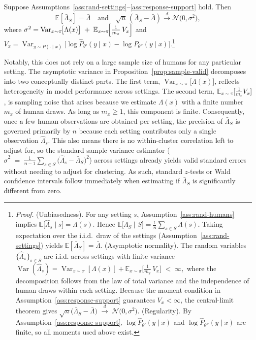 \begin{proposition}
\label{prop:sample-valid}
Suppose Assumptions~\ref{ass:rand-settings}--\ref{ass:response-support} hold.
Then
\[
\mathbb{E}[\bar{\Lambda}_{S}] = \bar{\Lambda}
\quad \text{and} \quad
\sqrt{n}\,(\bar{\Lambda}_{S}-\bar{\Lambda})
\xrightarrow{d} \mathcal{N}\bigl(0,\sigma^{2}\bigr),
\]
where $
\sigma^{2}
= \operatorname{Var}_{x\sim\pi}\!\bigl[\Lambda(x)\bigr]
\;+\;
\mathbb{E}_{x\sim\pi}\!\Bigl[\tfrac{1}{m_x}\,V_x\Bigr]$ and 
$V_x
= \operatorname{Var}_{y \sim P(\cdot \mid x)}
\bigl[\log\hat P_{\theta'}(y \mid x)
-\log\hat P_{\theta''}( y\mid x)\bigr].$\footnote{\emph{Proof.} (Unbiasedness).
For any setting $s$, Assumption~\ref{ass:rand-humans} implies $\mathbb{E}\bigl[\hat\Lambda_s \mid s\bigr]=\Lambda(s).$
Hence $\mathbb{E}\bigl[\bar\Lambda_S \mid S\bigr] = \frac{1}{n}\sum_{s \in S}\Lambda(s).$
Taking expectation over the i.i.d.\ draw of the settings (Assumption~\ref{ass:rand-settings}) yields $\mathbb{E}[\bar\Lambda_S]=\bar\Lambda.$
(Asymptotic normality).
The random variables $\{\hat\Lambda_s\}_{s \in S}$ are i.i.d. across settings with finite variance $
\operatorname{Var}(\hat\Lambda_s)
= \operatorname{Var}_{x\sim\pi}[\Lambda(x)]
+ \mathbb{E}_{x\sim\pi}
\bigl[{\textstyle\frac{1}{m_x}}\,V_x\bigr]
\;<\;\infty,$
where the decomposition follows from the law of total variance and the independence of human draws within each setting.
Because the moment condition in Assumption~\ref{ass:response-support} guarantees $V_x<\infty$, the central-limit theorem gives $\sqrt{n}\bigl(\bar\Lambda_S-\bar\Lambda\bigr)
\;\xrightarrow{d}\;
\mathcal N\bigl(0,\sigma^{2}\bigr).$
(Regularity).
By Assumption~\ref{ass:response-support},
$\log\hat P_{\theta'}(y\mid x)$ and $\log\hat P_{\theta''}(y\mid x)$ are finite, so all moments used above exist.}
\end{proposition}

Notably, this does not rely on a large sample size of humans for any particular setting.
The asymptotic variance in Proposition~\ref{prop:sample-valid} decomposes into two conceptually distinct parts.
The first term, $\operatorname{Var}_{x\sim\pi}\bigl[\Lambda(x)\bigr]$, reflects heterogeneity in model performance across settings.
The second term, $\mathbb{E}_{x\sim\pi}\bigl[\frac{1}{m_x}V_x\bigr]$, is sampling noise that arises because we estimate $\Lambda(x)$ with a finite number $m_x$ of human draws. 
As long as $m_x\ge 1$, this component is finite. 
Consequently, once a few human observations are obtained per setting, the precision of $\bar\Lambda_S$ is governed primarily by $n$ 
because each setting contributes only a single observation $\hat\Lambda_s$.
This also means there is no within-cluster correlation left to adjust for, so the standard sample variance estimator ($\hat{\sigma}^{2}\;=\;\frac{1}{n-1}\sum_{s\in S}\!\bigl(\hat{\Lambda}_{s}-\bar{\Lambda}_{S}\bigr)^{2}$) across settings already yields valid standard errors without needing to adjust for clustering.
As such, standard $z$-tests or Wald confidence intervals follow immediately when estimating if $\bar\Lambda_S$ is significantly different from zero.


